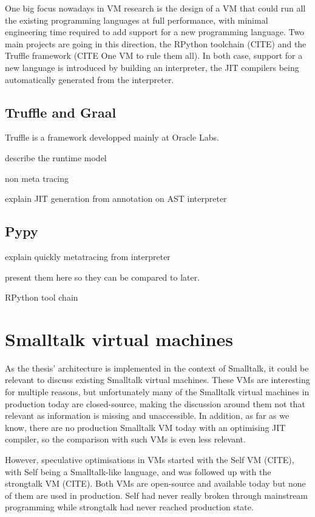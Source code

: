 \documentclass[a4paper,12pt,twoside]{../includes/ThesisStyle}
\begin{document}
One big focus nowadays in VM research is the design of a VM that could run all the existing programming languages at full performance, with minimal engineering time required to add support for a new programming language. Two main projects are going in this direction, the RPython toolchain (CITE) and the Truffle framework (CITE One VM to rule them all). In both case, support for a new language is introduced by building an interpreter, the JIT compilers being automatically generated from the interpreter.

\subsection{Truffle and Graal}

Truffle is a framework developped mainly at Oracle Labs. 

describe the runtime model

non meta tracing

explain JIT generation from annotation on AST interpreter

\subsection{Pypy}

explain quickly metatracing from interpreter

present them here so they can be compared to later.

RPython tool chain \cite{Rigo06a}

\section{Smalltalk virtual machines}

As the thesis' architecture is implemented in the context of Smalltalk, it could be relevant to discuss existing Smalltalk virtual machines. These VMs are interesting for multiple reasons, but unfortunately many of the Smalltalk virtual machines in production today are closed-source, making the discussion around them not that relevant as information is missing and unaccessible. In addition, as far as we know, there are no production Smalltalk VM today with an optimising JIT compiler, so the comparison with such VMs is even less relevant. 

However, speculative optimisations in VMs started with the Self VM (CITE), with Self being a Smalltalk-like language, and was followed up with the strongtalk VM (CITE). Both VMs are open-source and available today but none of them are used in production. Self had never really broken through mainstream programming while strongtalk had never reached production state.

\ifx\wholebook\relax\else
    
\end{document}
